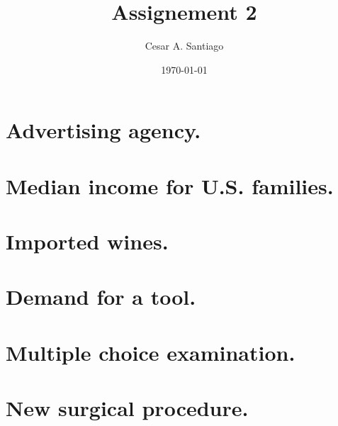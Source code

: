 \documentclass[a4paper, 12pt]{article}
\begin{document}
\title{Assignement 2}
\author{Cesar A. Santiago}
\date{\today}
\maketitle

\tableofcontents
\newpage
{}

\section{Advertising agency.}
\section{Median income for U.S. families.}
\section{Imported wines.}
\subsection{}
\subsection{}
\subsection{}
\section{Demand for a tool.}
\section{Multiple choice examination.}
\section{New surgical procedure.}
\subsection{}
\subsection{}
\subsection{}
\subsection{}
\end{document}
